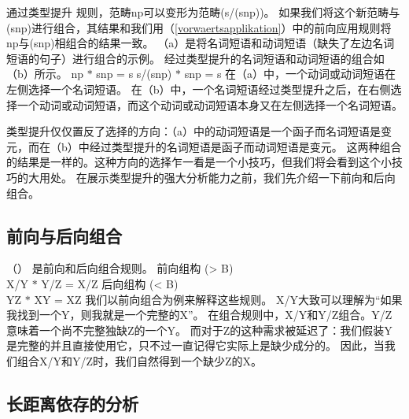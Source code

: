 通过类型提升
规则，范畴np可以变形为范畴(s/(s\bs np))。
如果我们将这个新范畴与(s\bs np)进行组合，其结果和我们用（\ref{vorwaertsapplikation}）中的前向应用规则将np与(s\bs np)相组合的结果一致。 
（a）是将名词短语和动词短语（缺失了左边名词短语的句子）进行组合的示例。
经过类型提升的名词短语和动词短语的组合如（b）所示。
\eal
\ex np $*$ s\bs np = s 
\ex s/(s\bs np) $*$ s\bs np = s
\zl
在（a）中，一个动词或动词短语在左侧选择一个名词短语。
在（b）中，一个名词短语经过类型提升之后，在右侧选择一个动词或动词短语，而这个动词或动词短语本身又在左侧选择一个名词短语。

类型提升仅仅置反了选择的方向：（a）中的动词短语是一个函子而名词短语是变元，而在（b）中经过类型提升的名词短语是函子而动词短语是变元。
这两种组合的结果是一样的。这种方向的选择乍一看是一个小技巧，但我们将会看到这个小技巧的大用处。
在展示类型提升的强大分析能力之前，我们先介绍一下前向和后向组合。 

\subsection{前向与后向组合}
\label{Kategorialgrammatik-Komposition}

（）
是前向和后向组合规则。
\eal
\ex\label{Regel-Vorwaertskomposition}
 前向组构
 (> B)\\
    X/Y $*$ Y/Z = X/Z 
\ex 后向组构
 (< B)\\
    Y\bs Z $*$ X\bs Y = X\bs Z
\zl 
我们以前向组合为例来解释这些规则。
X/Y大致可以理解为“如果我找到一个Y，则我就是一个完整的X”。
在组合规则中，X/Y和Y/Z组合。Y/Z意味着一个尚不完整独缺Z的一个Y。
而对于Z的这种需求被延迟了：我们假装Y是完整的并且直接使用它，只不过一直记得它实际上是缺少成分的。
因此，当我们组合X/Y和Y/Z时，我们自然得到一个缺少Z的X。 

\subsection{长距离依存的分析}
\label{Abschnitt-CG-UDC}

